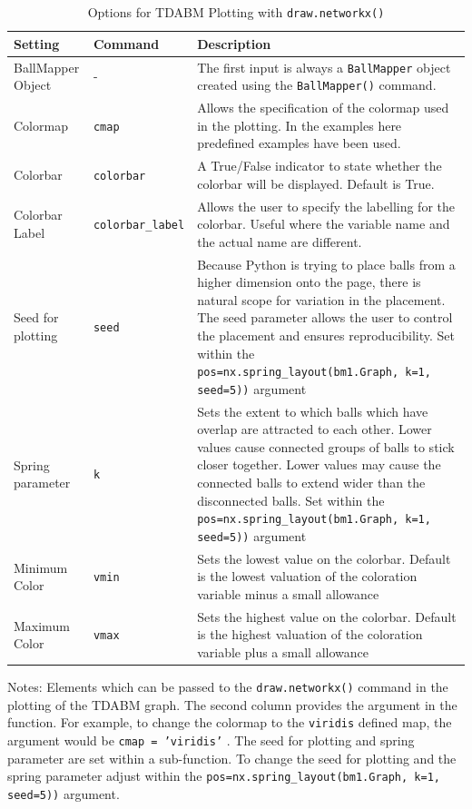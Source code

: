 \documentclass{article}
\begin{document}
\begin{table}
	\begin{center}
		\caption{Options for TDABM Plotting with \texttt{draw.networkx()}}
		\label{tab:plotinput}
		\begin{tabular}{|l |l |p{8cm}|}
		 \hline
		 Setting & Command & Description \\
		 \hline
		 BallMapper Object & - & The first input is always a \texttt{BallMapper} object created using the \texttt{BallMapper()} command. \\
		 \hline
		 Colormap & \texttt{cmap} & Allows the specification of the colormap used in the plotting. In the examples here predefined examples have been used.\\
		 \hline
		 Colorbar & \texttt{colorbar} & A True/False indicator to state whether the colorbar will be displayed. Default is True.\\
		 \hline
		 Colorbar Label & \texttt{colorbar\_label} & Allows the user to specify the labelling for the colorbar. Useful where the variable name and the actual name are different. \\
		 \hline
		 Seed for plotting & \texttt{seed} &  Because Python is trying to place balls from a higher dimension onto the page, there is natural scope for variation in the placement. The seed parameter allows the user to control the placement and ensures reproducibility. Set within the \texttt{pos=nx.spring\_layout(bm1.Graph, k=1, seed=5))} argument \\
		 \hline
		 Spring parameter & \texttt{k} & Sets the extent to which balls which have overlap are attracted to each other. Lower values cause connected groups of balls to stick closer together. Lower values may cause the connected balls to extend wider than the disconnected balls. Set within the \texttt{pos=nx.spring\_layout(bm1.Graph, k=1, seed=5))} argument\\
		 \hline
		 Minimum Color & \texttt{vmin} & Sets the lowest value on the colorbar. Default is the lowest valuation of the coloration variable minus a small allowance \\
		 \hline
		 Maximum Color & \texttt{vmax} & Sets the highest value on the colorbar. Default is the highest valuation of the coloration variable plus a small allowance \\
		 \hline
		\end{tabular}
	\end{center}
	\raggedright
	\footnotesize{Notes: Elements which can be passed to the \texttt{draw.networkx()} command in the plotting of the TDABM graph. The second column provides the argument in the function. For example, to change the colormap to the \texttt{viridis} defined map, the argument would be \texttt{cmap = 'viridis'} . The seed for plotting and spring parameter are set within a sub-function. To change the seed for plotting and the spring parameter adjust within the \texttt{pos=nx.spring\_layout(bm1.Graph, k=1, seed=5))} argument.}
\end{table}
\end{document}
